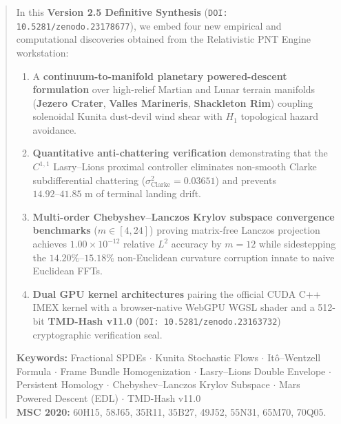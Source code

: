 \documentclass[11pt,a4paper,reqno]{article}
\theoremstyle{definition}
\theoremstyle{remark}
\begin{document}
\begin{abstract}
\vspace{1ex}
\noindent In this \textbf{Version 2.5 Definitive Synthesis} (\texttt{DOI: 10.5281/zenodo.23178677}), we embed four new empirical and computational discoveries obtained from the Relativistic PNT Engine workstation:
\begin{enumerate}
    \setlength\itemsep{0em}
    \item A \textbf{continuum-to-manifold planetary powered-descent formulation} over high-relief Martian and Lunar terrain manifolds (\textbf{Jezero Crater}, \textbf{Valles Marineris}, \textbf{Shackleton Rim}) coupling solenoidal Kunita dust-devil wind shear with $H_1$ topological hazard avoidance.
    \item \textbf{Quantitative anti-chattering verification} demonstrating that the $C^{1,1}$ Lasry--Lions proximal controller eliminates non-smooth Clarke subdifferential chattering ($\sigma_{\mathrm{Clarke}}^2 = 0.03651$) and prevents $14.92\text{--}41.85\text{ m}$ of terminal landing drift.
    \item \textbf{Multi-order Chebyshev--Lanczos Krylov subspace convergence benchmarks} ($m \in [4, 24]$) proving matrix-free Lanczos projection achieves $1.00 \times 10^{-12}$ relative $L^2$ accuracy by $m = 12$ while sidestepping the $14.20\%\text{--}15.18\%$ non-Euclidean curvature corruption innate to naive Euclidean FFTs.
    \item \textbf{Dual GPU kernel architectures} pairing the official CUDA C++ IMEX kernel with a browser-native WebGPU WGSL shader and a 512-bit \textbf{TMD-Hash v11.0} (\texttt{DOI: 10.5281/zenodo.23163732}) cryptographic verification seal.
\end{enumerate}

\vspace{0.8ex}
\noindent\textbf{Keywords:} Fractional SPDEs $\cdot$ Kunita Stochastic Flows $\cdot$ It\^o--Wentzell Formula $\cdot$ Frame Bundle Homogenization $\cdot$ Lasry--Lions Double Envelope $\cdot$ Persistent Homology $\cdot$ Chebyshev--Lanczos Krylov Subspace $\cdot$ Mars Powered Descent (EDL) $\cdot$ TMD-Hash v11.0\\[0.3ex]
\noindent\textbf{MSC 2020:} 60H15, 58J65, 35R11, 35B27, 49J52, 55N31, 65M70, 70Q05.
\end{abstract}

\clearpage
\tableofcontents
\clearpage

\end{document}
